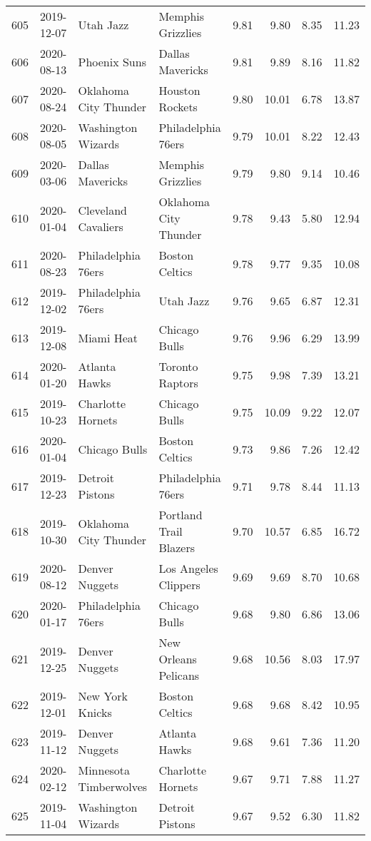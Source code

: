 \documentclass[
  11pt,
]{article}
\theoremstyle{nonumberplain}
\begin{document}
\begin{longtable}{rl|llr|rrr}
605 & 2019-12-07 & Utah Jazz & Memphis Grizzlies & 9.81 & 9.80 & 8.35 & 11.23\\
606 & 2020-08-13 & Phoenix Suns & Dallas Mavericks & 9.81 & 9.89 & 8.16 & 11.82\\
607 & 2020-08-24 & Oklahoma City Thunder & Houston Rockets & 9.80 & 10.01 & 6.78 & 13.87\\
608 & 2020-08-05 & Washington Wizards & Philadelphia 76ers & 9.79 & 10.01 & 8.22 & 12.43\\
609 & 2020-03-06 & Dallas Mavericks & Memphis Grizzlies & 9.79 & 9.80 & 9.14 & 10.46\\
610 & 2020-01-04 & Cleveland Cavaliers & Oklahoma City Thunder & 9.78 & 9.43 & 5.80 & 12.94\\
611 & 2020-08-23 & Philadelphia 76ers & Boston Celtics & 9.78 & 9.77 & 9.35 & 10.08\\
612 & 2019-12-02 & Philadelphia 76ers & Utah Jazz & 9.76 & 9.65 & 6.87 & 12.31\\
613 & 2019-12-08 & Miami Heat & Chicago Bulls & 9.76 & 9.96 & 6.29 & 13.99\\
614 & 2020-01-20 & Atlanta Hawks & Toronto Raptors & 9.75 & 9.98 & 7.39 & 13.21\\
615 & 2019-10-23 & Charlotte Hornets & Chicago Bulls & 9.75 & 10.09 & 9.22 & 12.07\\
616 & 2020-01-04 & Chicago Bulls & Boston Celtics & 9.73 & 9.86 & 7.26 & 12.42\\
617 & 2019-12-23 & Detroit Pistons & Philadelphia 76ers & 9.71 & 9.78 & 8.44 & 11.13\\
618 & 2019-10-30 & Oklahoma City Thunder & Portland Trail Blazers & 9.70 & 10.57 & 6.85 & 16.72\\
619 & 2020-08-12 & Denver Nuggets & Los Angeles Clippers & 9.69 & 9.69 & 8.70 & 10.68\\
620 & 2020-01-17 & Philadelphia 76ers & Chicago Bulls & 9.68 & 9.80 & 6.86 & 13.06\\
621 & 2019-12-25 & Denver Nuggets & New Orleans Pelicans & 9.68 & 10.56 & 8.03 & 17.97\\
622 & 2019-12-01 & New York Knicks & Boston Celtics & 9.68 & 9.68 & 8.42 & 10.95\\
623 & 2019-11-12 & Denver Nuggets & Atlanta Hawks & 9.68 & 9.61 & 7.36 & 11.20\\
624 & 2020-02-12 & Minnesota Timberwolves & Charlotte Hornets & 9.67 & 9.71 & 7.88 & 11.27\\
625 & 2019-11-04 & Washington Wizards & Detroit Pistons & 9.67 & 9.52 & 6.30 & 11.82\\

\end{longtable}
\end{document}
